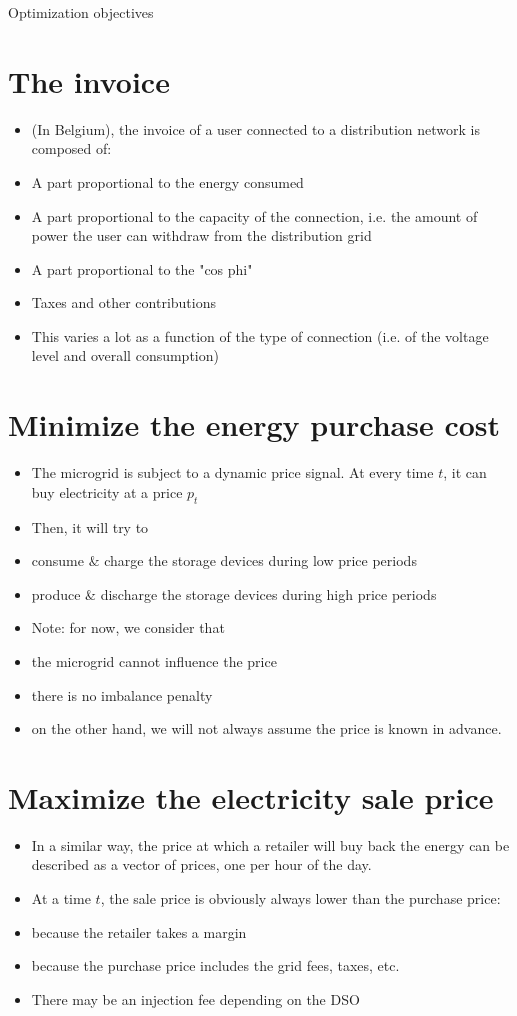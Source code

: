 \documentclass[10pt]{article}
\begin{document}
Optimization objectives

\section*{The invoice}
\begin{itemize}
  \item (In Belgium), the invoice of a user connected to a distribution network is composed of:
  \item A part proportional to the energy consumed
  \item A part proportional to the capacity of the connection, i.e. the amount of power the user can withdraw from the distribution grid
  \item A part proportional to the "cos phi"
  \item Taxes and other contributions
  \item This varies a lot as a function of the type of connection (i.e. of the voltage level and overall consumption)
\end{itemize}

\section*{Minimize the energy purchase cost}
\begin{itemize}
  \item The microgrid is subject to a dynamic price signal. At every time $t$, it can buy electricity at a price $p_{t}$
  \item Then, it will try to
  \item consume $\&$ charge the storage devices during low price periods
  \item produce \& discharge the storage devices during high price periods
  \item Note: for now, we consider that
  \item the microgrid cannot influence the price
  \item there is no imbalance penalty
  \item on the other hand, we will not always assume the price is known in advance.
\end{itemize}

\section*{Maximize the electricity sale price}
\begin{itemize}
  \item In a similar way, the price at which a retailer will buy back the energy can be described as a vector of prices, one per hour of the day.
  \item At a time $t$, the sale price is obviously always lower than the purchase price:
  \item because the retailer takes a margin
  \item because the purchase price includes the grid fees, taxes, etc.
  \item There may be an injection fee depending on the DSO
\end{itemize}
\end{document}
